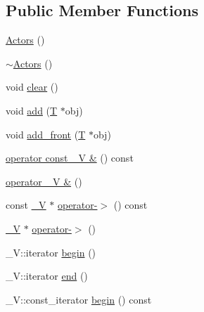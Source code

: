 \subsection*{Public Member Functions}
\begin{DoxyCompactItemize}
\item 
\hyperlink{class_d_d4hep_1_1_simulation_1_1_geant4_action_1_1_actors_af8c90e54776c4e396fbce217553611ec}{Actors} ()
\item 
\hyperlink{class_d_d4hep_1_1_simulation_1_1_geant4_action_1_1_actors_a3c0f3b0099d834512cbdb13c9555c783}{$\sim$Actors} ()
\item 
void \hyperlink{class_d_d4hep_1_1_simulation_1_1_geant4_action_1_1_actors_a6f7c4daf69449e916f62cf5767041aa8}{clear} ()
\item 
void \hyperlink{class_d_d4hep_1_1_simulation_1_1_geant4_action_1_1_actors_af07f7dfb10fad18b8580460f44c88f49}{add} (\hyperlink{class_t}{T} $\ast$obj)
\item 
void \hyperlink{class_d_d4hep_1_1_simulation_1_1_geant4_action_1_1_actors_a024c3bcc6d543af13bf58066d245df9a}{add\_\-front} (\hyperlink{class_t}{T} $\ast$obj)
\item 
\hyperlink{class_d_d4hep_1_1_simulation_1_1_geant4_action_1_1_actors_afcd9da6e3de33b39daceccca1522f0e8}{operator const \_\-V \&} () const 
\item 
\hyperlink{class_d_d4hep_1_1_simulation_1_1_geant4_action_1_1_actors_add6d146b0484877366303b2a7dd7435f}{operator \_\-V \&} ()
\item 
const \hyperlink{class_d_d4hep_1_1_simulation_1_1_geant4_action_1_1_actors_a18b6dfb1542a2cd036d8317db48f6c16}{\_\-V} $\ast$ \hyperlink{class_d_d4hep_1_1_simulation_1_1_geant4_action_1_1_actors_ab3f3e4e31d4e16ccb556950bc758e625}{operator-\/$>$} () const 
\item 
\hyperlink{class_d_d4hep_1_1_simulation_1_1_geant4_action_1_1_actors_a18b6dfb1542a2cd036d8317db48f6c16}{\_\-V} $\ast$ \hyperlink{class_d_d4hep_1_1_simulation_1_1_geant4_action_1_1_actors_a74da9b8e362394518116e48f8f0d6c63}{operator-\/$>$} ()
\item 
\_\-V::iterator \hyperlink{class_d_d4hep_1_1_simulation_1_1_geant4_action_1_1_actors_a400f8d564251e0bba5cdb1e35f58b72a}{begin} ()
\item 
\_\-V::iterator \hyperlink{class_d_d4hep_1_1_simulation_1_1_geant4_action_1_1_actors_aa1b133c19db8c70d6a46a19fefa430a2}{end} ()
\item 
\_\-V::const\_\-iterator \hyperlink{class_d_d4hep_1_1_simulation_1_1_geant4_action_1_1_actors_a6a4ddb5b54c6676c1f4856d331638a1d}{begin} () const 

\end{DoxyCompactItemize}
